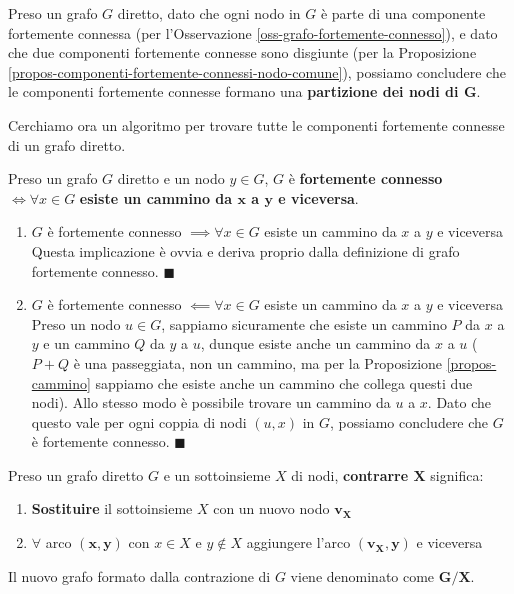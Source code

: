\documentclass[11pt, a4paper, titlepage, oneside]{scrbook}
\begin{document}
\begin{Proposizione}[Corollario]
\label{corol-componenti}
Preso un grafo $G$ diretto, dato che ogni nodo in $G$ è parte di una componente fortemente connessa (per l'Osservazione \ref{oss-grafo-fortemente-connesso}), e dato che due componenti fortemente connesse sono disgiunte (per la Proposizione \ref{propos-componenti-fortemente-connessi-nodo-comune}), possiamo concludere che le componenti fortemente connesse formano una \textbf{partizione dei nodi di $\bm{G}$}.
\end{Proposizione}

Cerchiamo ora un algoritmo per trovare tutte le componenti fortemente connesse di un grafo diretto.

\begin{Proposizione}[]
\label{propos-grafo-f-c-cammino-sempre}
Preso un grafo $G$ diretto e un nodo $y \in G$, $G$ è \textbf{fortemente connesso} $\iff \forall x \in G$ \textbf{esiste un cammino da $\bm{x}$ a $\bm{y}$ e viceversa}. 
\end{Proposizione}

\Dimostrazione \nopagebreak

\begin{enumerate}[label=\arabic*°]
    \item $G$ è fortemente connesso $\implies \forall x \in G$ esiste un cammino da $x$ a $y$ e viceversa \\
    Questa implicazione è ovvia e deriva proprio dalla definizione di grafo fortemente connesso. $\blacksquare$
    \item $G$ è fortemente connesso $\impliedby \forall x \in G$ esiste un cammino da $x$ a $y$ e viceversa \\
    Preso un nodo $u \in G$, sappiamo sicuramente che esiste un cammino $P$ da $x$ a $y$ e un cammino $Q$ da $y$ a $u$, dunque esiste anche un cammino da $x$ a $u$ ($P + Q$ è una passeggiata, non un cammino, ma per la Proposizione \ref{propos-cammino} sappiamo che esiste anche un cammino che collega questi due nodi). Allo stesso modo è possibile trovare un cammino da $u$ a $x$. Dato che questo vale per ogni coppia di nodi $(u,x)$ in $G$, possiamo concludere che $G$ è fortemente connesso. $\blacksquare$
\end{enumerate}

\begin{Definizione}
\label{def-contrarre}
Preso un grafo diretto $G$ e un sottoinsieme $X$ di nodi, \textbf{contrarre $\bm{X}$} significa:
\begin{enumerate}[label=\arabic*°]
    \item \textbf{Sostituire} il sottoinsieme $X$ con un nuovo nodo $\bm{v_X}$
    \item $\forall$ arco $\bm{(x,y)}$ con $x \in X$ e $y \notin X$ aggiungere l'arco $\bm{(v_X, y)}$ e viceversa
\end{enumerate} 
Il nuovo grafo formato dalla contrazione di $G$ viene denominato come $\bm{G/X}$.
\end{Definizione}
\end{document}
